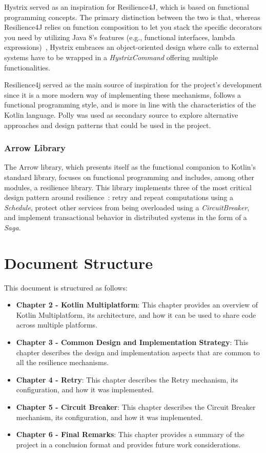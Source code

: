 Hystrix served as an inspiration for Resilience4J, which is based on functional programming concepts.
The primary distinction between the two is that, whereas Resilience4J relies on function composition to let you stack the specific decorators you need by utilizing Java 8's features (e.g., functional interfaces, lambda expressions)~\cite{resilience4j-vs-hystrix}, Hystrix embraces an object-oriented design where calls to external systems have to be wrapped in a \textit{HystrixCommand} offering multiple functionalities.

Resilience4j served as the main source of inspiration for the project's development since it is a more modern way of implementing these mechanisms, follows a functional programming style, and is more in line with the characteristics of the Kotlin language.
Polly was used as secondary source to explore alternative approaches and design patterns that could be used in the project.

\subsubsection{Arrow Library}

The Arrow library, which presents itself as the functional companion to Kotlin's standard library, focuses on functional programming and includes, among other modules, a resilience library.
This library implements three of the most critical design pattern around resilience~\cite{arrow-resilience}: retry and repeat computations using a \textit{Schedule}, protect other services from being overloaded using a \textit{CircuitBreaker}, and implement transactional behavior in distributed systems in the form of a \textit{Saga}.


\section{Document Structure}\label{sec:document-structure}

This document is structured as follows:

\begin{itemize}
    \item \textbf{Chapter 2 - Kotlin Multiplatform}: This chapter provides an overview of Kotlin Multiplatform, its architecture, and how it can be used to share code across multiple platforms.
    \item \textbf{Chapter 3 - Common Design and Implementation Strategy}: This chapter describes the design and implementation aspects that are common to all the resilience mechanisms.
    \item \textbf{Chapter 4 - Retry}: This chapter describes the Retry mechanism, its configuration, and how it was implemented.
    \item \textbf{Chapter 5 - Circuit Breaker}: This chapter describes the Circuit Breaker mechanism, its configuration, and how it was implemented.
    \item \textbf{Chapter 6 - Final Remarks}: This chapter provides a summary of the project in a conclusion format and provides future work considerations.
\end{itemize}
